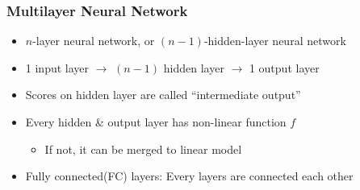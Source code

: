 \subsubsection*{Multilayer Neural Network}
\begin{itemize}
    \item $n$-layer neural network, or $(n-1)$-hidden-layer neural network
    \item 1 input layer $\rightarrow$ $(n-1)$ hidden layer $\rightarrow$ 1 output layer
    \item Scores on hidden layer are called ``intermediate output''
    \item Every hidden \& output layer has non-linear function $f$
    \begin{itemize}
        \item If not, it can be merged to linear model
    \end{itemize}
    \item Fully connected(FC) layers: Every layers are connected each other
\end{itemize}
\begin{figures}
\end{figures}
\clearpage

